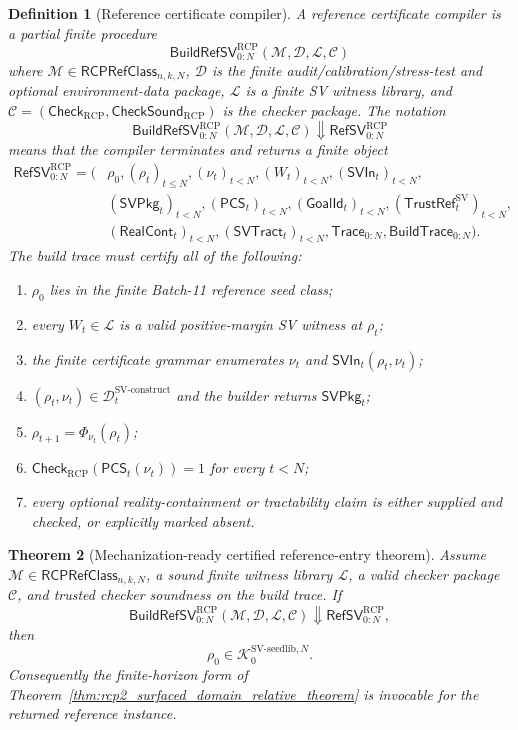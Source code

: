 \documentclass[11pt]{article}
\newtheorem{theorem}{Theorem}[section]
\newtheorem{definition}[theorem]{Definition}
\newcommand{\1}{\mathbf{1}}
\newcommand{\RCP}{\mathrm{RCP}}
\providecommand{\Dcal}{\mathcal{D}}
\providecommand{\Kcal}{\mathcal{K}}
\begin{document}
\begin{definition}[Reference certificate compiler]
\label{def:batch13r_reference_certificate_compiler}
A reference certificate compiler is a partial finite procedure
\[
\mathsf{BuildRefSV}_{0:N}^{\RCP}(\mathcal M,\mathcal D,\mathcal L,\mathcal C)
\]
where \(\mathcal M\in\mathsf{RCPRefClass}_{n,k,N}\), \(\mathcal D\) is the finite audit/calibration/stress-test and optional environment-data package, \(\mathcal L\) is a finite SV witness library, and \(\mathcal C=(\mathsf{Check}_{\RCP},\mathsf{CheckSound}_{\RCP})\) is the checker package.  The notation
\[
\mathsf{BuildRefSV}_{0:N}^{\RCP}(\mathcal M,\mathcal D,\mathcal L,\mathcal C)
\Downarrow
\mathsf{RefSV}_{0:N}^{\RCP}
\]
means that the compiler terminates and returns a finite object
\[
\begin{aligned}
\mathsf{RefSV}_{0:N}^{\RCP}=(&\rho_0,(\rho_t)_{t\le N},(\nu_t)_{t<N},(W_t)_{t<N},
(\mathsf{SVIn}_t)_{t<N},\\
&(\mathsf{SVPkg}_t)_{t<N},(\mathsf{PCS}_t)_{t<N},
(\mathsf{GoalId}_t)_{t<N},(\mathsf{TrustRef}_t^{\mathrm{SV}})_{t<N},\\
&(\mathsf{RealCont}_t)_{t<N},(\mathsf{SVTract}_t)_{t<N},
\mathsf{Trace}_{0:N},\mathsf{BuildTrace}_{0:N}).
\end{aligned}
\]
The build trace must certify all of the following:
\begin{enumerate}[label=(\roman*),leftmargin=1.5em]
    \item \(\rho_0\) lies in the finite Batch-11 reference seed class;
    \item every \(W_t\in\mathcal L\) is a valid positive-margin SV witness at \(\rho_t\);
    \item the finite certificate grammar enumerates \(\nu_t\) and \(\mathsf{SVIn}_t(\rho_t,\nu_t)\);
    \item \((\rho_t,\nu_t)\in\Dcal_t^{\mathrm{SV\mbox{-}construct}}\) and the builder returns \(\mathsf{SVPkg}_t\);
    \item \(\rho_{t+1}=\Phi_{\nu_t}(\rho_t)\);
    \item \(\mathsf{Check}_{\RCP}(\mathsf{PCS}_t(\nu_t))=1\) for every \(t<N\);
    \item every optional reality-containment or tractability claim is either supplied and checked, or explicitly marked absent.
\end{enumerate}
\end{definition}

\begin{theorem}[Mechanization-ready certified reference-entry theorem]
\label{thm:batch13r_certified_reference_entry}
Assume \(\mathcal M\in\mathsf{RCPRefClass}_{n,k,N}\), a sound finite witness library \(\mathcal L\), a valid checker package \(\mathcal C\), and trusted checker soundness on the build trace.  If
\[
\boxed{
\mathsf{BuildRefSV}_{0:N}^{\RCP}(\mathcal M,\mathcal D,\mathcal L,\mathcal C)
\Downarrow
\mathsf{RefSV}_{0:N}^{\RCP},
}
\]
then
\[
\boxed{
\rho_0\in\Kcal_0^{\mathrm{SV\mbox{-}seedlib},N}.
}
\]
Consequently the finite-horizon form of Theorem~\ref{thm:rcp2_surfaced_domain_relative_theorem} is invocable for the returned reference instance.
\end{theorem}
\end{document}
